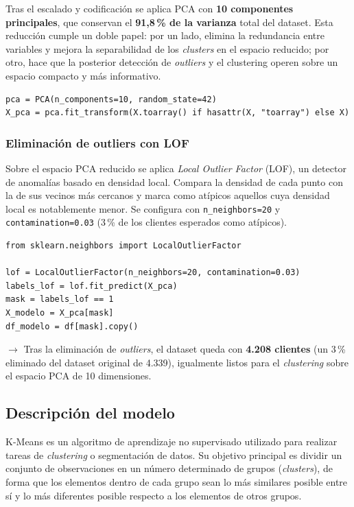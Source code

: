 \documentclass[11pt,a4paper]{article}
\begin{document}
Tras el escalado y codificación se aplica PCA con \textbf{10 componentes principales}, que conservan el \textbf{91,8\,\% de la varianza} total del dataset. Esta reducción cumple un doble papel: por un lado, elimina la redundancia entre variables y mejora la separabilidad de los \textit{clusters} en el espacio reducido; por otro, hace que la posterior detección de \textit{outliers} y el clustering operen sobre un espacio compacto y más informativo.

\begin{lstlisting}
pca = PCA(n_components=10, random_state=42)
X_pca = pca.fit_transform(X.toarray() if hasattr(X, "toarray") else X)
\end{lstlisting}

\subsubsection{Eliminación de outliers con LOF}

Sobre el espacio PCA reducido se aplica \textit{Local Outlier Factor} (LOF), un detector de anomalías basado en densidad local. Compara la densidad de cada punto con la de sus vecinos más cercanos y marca como atípicos aquellos cuya densidad local es notablemente menor. Se configura con \texttt{n\_neighbors=20} y \texttt{contamination=0.03} (3\,\% de los clientes esperados como atípicos).

\begin{lstlisting}
from sklearn.neighbors import LocalOutlierFactor

lof = LocalOutlierFactor(n_neighbors=20, contamination=0.03)
labels_lof = lof.fit_predict(X_pca)
mask = labels_lof == 1
X_modelo = X_pca[mask]
df_modelo = df[mask].copy()
\end{lstlisting}

\noindent$\rightarrow$ Tras la eliminación de \textit{outliers}, el dataset queda con \textbf{4.208 clientes} (un 3\,\% eliminado del dataset original de 4.339), igualmente listos para el \textit{clustering} sobre el espacio PCA de 10 dimensiones.

\subsection{Descripción del modelo}

K-Means es un algoritmo de aprendizaje no supervisado utilizado para realizar tareas de \textit{clustering} o segmentación de datos. Su objetivo principal es dividir un conjunto de observaciones en un número determinado de grupos (\textit{clusters}), de forma que los elementos dentro de cada grupo sean lo más similares posible entre sí y lo más diferentes posible respecto a los elementos de otros grupos.
\end{document}
